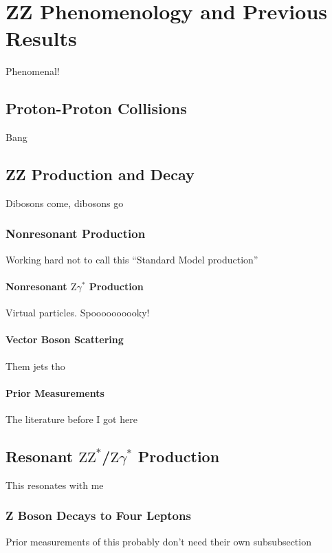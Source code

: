 \chapter{ZZ Phenomenology and Previous Results}
Phenomenal!

\section{Proton-Proton Collisions}
Bang



\section{ZZ Production and Decay}
Dibosons come, dibosons go

\subsection{Nonresonant Production}
Working hard not to call this ``Standard Model production''

\subsubsection{Nonresonant
               \texorpdfstring{$\mathrm{Z}\gamma^\ast$}{Zgamma}
               Production}
Virtual particles. Spoooooooooky!

\subsubsection{Vector Boson Scattering}
Them jets tho

\subsubsection{Prior Measurements}
The literature before I got here


\section{Resonant
         \texorpdfstring{$\mathrm{ZZ}^\ast$/$\mathrm{Z}\gamma^\ast$}
         {ZZ*/Zgamma*}
         Production
         }
This resonates with me

\subsection{Z Boson Decays to Four Leptons}
Prior measurements of this probably don't need their own subsubsection


